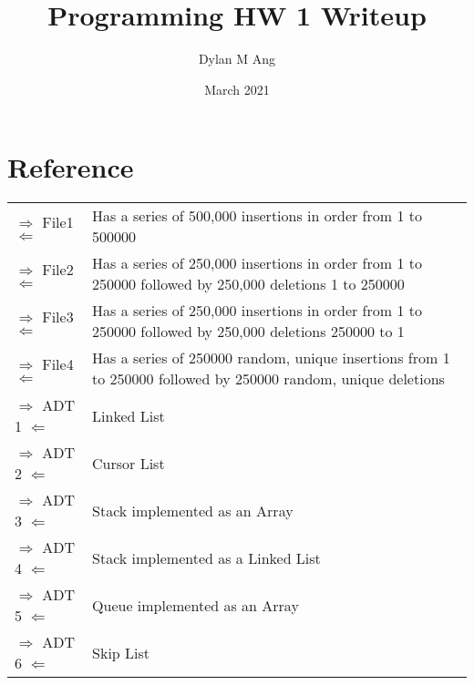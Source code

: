 \documentclass[12pt]{article}
\title{Programming HW 1 Writeup}
\author{Dylan M Ang}
\date{March 2021}
\begin{document}
\maketitle

\tableofcontents

\section{Reference}
\begin{center}
    \begin{tabular}{p{3cm} p{12cm}}
        $\Rightarrow$ File1 $\Leftarrow$ & Has a series of 500,000 insertions in order from 1 to 500000 \\
        $\Rightarrow$ File2 $\Leftarrow$ & Has a series of 250,000 insertions in order from 1 to 250000 followed by 250,000 deletions 1 to 250000 \\
        $\Rightarrow$ File3 $\Leftarrow$ & Has a series of 250,000 insertions in order from 1 to 250000 followed by 250,000 deletions 250000 to 1 \\
        $\Rightarrow$ File4 $\Leftarrow$ & Has a series of 250000 random, unique insertions from 1 to 250000 followed by 250000 random, unique deletions \\

        $\Rightarrow$ ADT 1 $\Leftarrow$ & Linked List \\
        $\Rightarrow$ ADT 2 $\Leftarrow$ & Cursor List \\
        $\Rightarrow$ ADT 3 $\Leftarrow$ & Stack implemented as an Array \\
        $\Rightarrow$ ADT 4 $\Leftarrow$ & Stack implemented as a Linked List \\
        $\Rightarrow$ ADT 5 $\Leftarrow$ & Queue implemented as an Array \\
        $\Rightarrow$ ADT 6 $\Leftarrow$ & Skip List \\
    \end{tabular}
\end{center}

\end{document}
